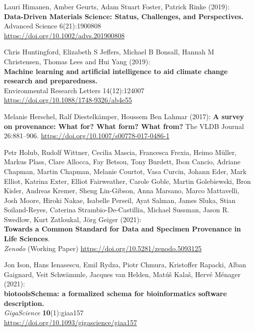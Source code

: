 \documentclass[10pt,letterpaper]{article}
\begin{document}
\begin{thebibliography}{10}
 Lauri Himanen, Amber Geurts, Adam Stuart Foster,
Patrick Rinke (2019):\\
\textbf{Data-Driven Materials Science: Status, Challenges, and
Perspectives.}\\
Advanced Science 6(21):1900808\\
\url{https://doi.org/10.1002/advs.201900808}

 Chris Huntingford, Elizabeth S Jeffers, Michael B
Bonsall, Hannah M Christensen, Thomas Lees and Hui Yang (2019):\\
\textbf{Machine learning and artificial intelligence to aid climate
change research and preparedness.}\\
Environmental Research Letters 14(12):124007\\
\url{https://doi.org/10.1088/1748-9326/ab4e55}

 Melanie Herschel, Ralf Diestelkämper, Houssem Ben
Lahmar (2017): \textbf{A survey on provenance: What for? What form? What
from?} The VLDB Journal 26:881--906.
\url{https://doi.org/10.1007/s00778-017-0486-1}

 Petr Holub, Rudolf Wittner, Cecilia Mascia, Francesca
Frexia, Heimo Müller, Markus Plass, Clare Allocca, Fay Betsou, Tony
Burdett, Ibon Cancio, Adriane Chapman, Martin Chapman, Melanie Courtot,
Vasa Curcin, Johann Eder, Mark Elliot, Katrina Exter, Elliot
Fairweather, Carole Goble, Martin Golebiewski, Bron Kisler, Andreas
Kremer, Sheng Lin-Gibson, Anna Marsano, Marco Mattavelli, Josh Moore,
Hiroki Nakae, Isabelle Perseil, Ayat Salman, James Sluka, Stian
Soiland-Reyes, Caterina Strambio-De-Castillia, Michael Sussman, Jason R.
Swedlow, Kurt Zatloukal, Jörg Geiger (2021):\\
\textbf{Towards a Common Standard for Data and Specimen Provenance in
Life Sciences}.\\
\emph{Zenodo} (Working Paper)\emph{\hfill\break
}\url{https://doi.org/10.5281/zenodo.5093125}

 Jon Ison, Hans Ienasescu, Emil Rydza, Piotr Chmura,
Kristoffer Rapacki, Alban Gaignard, Veit Schwämmle, Jacques van Helden,
Matúš Kalaš, Hervé Ménager (2021):\\
\textbf{biotoolsSchema: a formalized schema for bioinformatics software
description.\\
}\emph{GigaScience} \textbf{10}(1):giaa157\\
\url{https://doi.org/10.1093/gigascience/giaa157}


\end{thebibliography}
\end{document}

